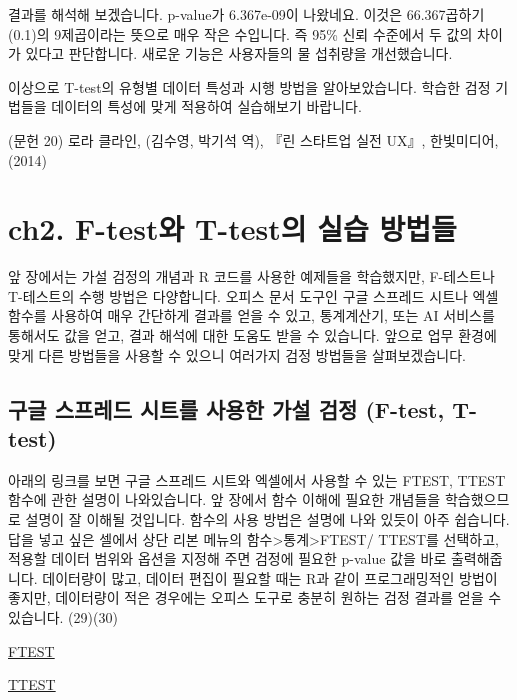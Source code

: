 \documentclass[
  letterpaper,
]{book}
\begin{document}
\begin{itemize}
  결과를 해석해 보겠습니다. p-value가 6.367e-09이 나왔네요. 이것은
  66.367곱하기 (0.1)의 9제곱이라는 뜻으로 매우 작은 수입니다. 즉 95\%
  신뢰 수준에서 두 값의 차이가 있다고 판단합니다. 새로운 기능은
  사용자들의 물 섭취량을 개선했습니다.

  이상으로 T-test의 유형별 데이터 특성과 시행 방법을 알아보았습니다.
  학습한 검정 기법들을 데이터의 특성에 맞게 적용하여 실습해보기
  바랍니다.
\end{itemize}

(문헌 20) 로라 클라인, (김수영, 박기석 역), 『린 스타트업 실전 UX』,
한빛미디어,(2014)

\chapter{ch2. F-test와 T-test의 실습
방법들}\label{ch2.-f-testuxc640-t-testuxc758-uxc2e4uxc2b5-uxbc29uxbc95uxb4e4}

앞 장에서는 가설 검정의 개념과 R 코드를 사용한 예제들을 학습했지만,
F-테스트나 T-테스트의 수행 방법은 다양합니다. 오피스 문서 도구인 구글
스프레드 시트나 엑셀 함수를 사용하여 매우 간단하게 결과를 얻을 수 있고,
통계계산기, 또는 AI 서비스를 통해서도 값을 얻고, 결과 해석에 대한 도움도
받을 수 있습니다. 앞으로 업무 환경에 맞게 다른 방법들을 사용할 수 있으니
여러가지 검정 방법들을 살펴보겠습니다.

\section{구글 스프레드 시트를 사용한 가설 검정 (F-test,
T-test)}\label{uxad6cuxae00-uxc2a4uxd504uxb808uxb4dc-uxc2dcuxd2b8uxb97c-uxc0acuxc6a9uxd55c-uxac00uxc124-uxac80uxc815-f-test-t-test}

아래의 링크를 보면 구글 스프레드 시트와 엑셀에서 사용할 수 있는 FTEST,
TTEST 함수에 관한 설명이 나와있습니다. 앞 장에서 함수 이해에 필요한
개념들을 학습했으므로 설명이 잘 이해될 것입니다. 함수의 사용 방법은
설명에 나와 있듯이 아주 쉽습니다. 답을 넣고 싶은 셀에서 상단 리본 메뉴의
함수\textgreater 통계\textgreater FTEST/ TTEST를 선택하고, 적용할 데이터
범위와 옵션을 지정해 주면 검정에 필요한 p-value 값을 바로 출력해줍니다.
데이터량이 많고, 데이터 편집이 필요할 때는 R과 같이 프로그래밍적인
방법이 좋지만, 데이터량이 적은 경우에는 오피스 도구로 충분히 원하는 검정
결과를 얻을 수 있습니다. (29)(30)

\href{https://support.google.com/docs/answer/7004183?hl=ko&ref_topic=3105600}{FTEST}

\href{https://support.google.com/docs/answer/6055837?hl=ko}{TTEST}
\end{document}
